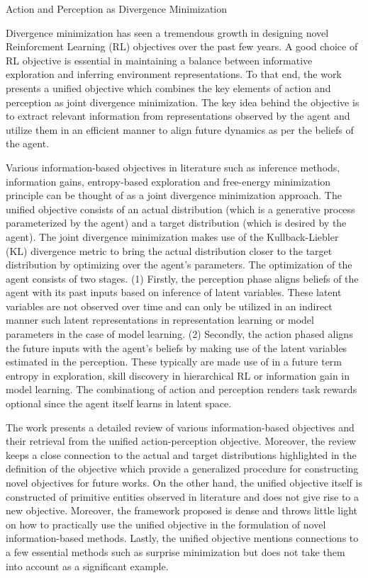 \documentclass[11pt,letterpaper]{article}
\begin{document}
\begin{center}
  \large{Action and Perception as Divergence Minimization}
\end{center}


Divergence minimization has seen a tremendous growth in designing novel Reinforcment Learning (RL) objectives over the past few years. A good choice of RL objective is essential in maintaining a balance between informative exploration and inferring environment representations. To that end, the work presents a unified objective which combines the key elements of action and perception as joint divergence minimization. The key idea behind the objective is to extract relevant information from representations observed by the agent and utilize them in an efficient manner to align future dynamics as per the beliefs of the agent.

Various information-based objectives in literature such as inference methods, information gains, entropy-based exploration and free-energy minimization principle can be thought of as a joint divergence minimization approach. The unified objective consists of an actual distribution (which is a generative process parameterized by the agent) and a target distribution (which is desired by the agent). The joint divergence minimization makes use of the Kullback-Liebler (KL) divergence metric to bring the actual distribution closer to the target distribution by optimizing over the agent's parameters. The optimization of the agent consists of two stages. (1) Firstly, the perception phase aligns beliefs of the agent with its past inputs based on inference of latent variables. These latent variables are not observed over time and can only be utilized in an indirect manner such latent representations in representation learning or model parameters in the case of model learning. (2) Secondly, the action phased aligns the future inputs with the agent's beliefs by making use of the latent variables estimated in the perception. These typically are made use of in a future term entropy in exploration, skill discovery in hierarchical RL or information gain in model learning. The combinationg of action and perception renders task rewards optional since the agent itself learns in latent space.

The work presents a detailed review of various information-based objectives and their retrieval from the unified action-perception objective. Moreover, the review keeps a close connection to the actual and target distributions highlighted in the definition of the objective which provide a generalized procedure for constructing novel objectives for future works. On the other hand, the unified objective itself is constructed of primitive entities observed in literature and does not give rise to a new objective. Moreover, the framework proposed is dense and throws little light on how to practically use the unified objective in the formulation of novel information-based methods. Lastly, the unified objective mentions connections to a few essential methods such as surprise minimization but does not take them into account as a significant example.   
\end{document}
